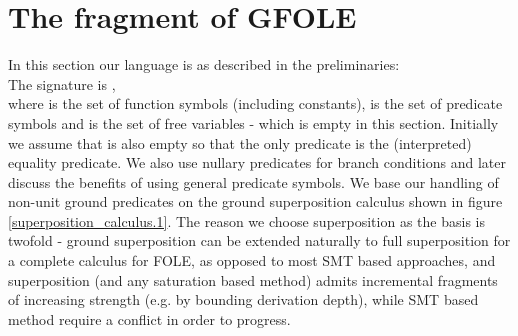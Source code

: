 \section{The fragment of GFOLE}\label{section:gfole_basic}
In this section our language is as described in the preliminaries:\\
The signature is \m{\Sigma=\Fs{\Sigma} \cup \Ps{\Sigma} \cup \Vs{\Sigma}},\\
where \m{\Fs{\Sigma}} is the set of function symbols (including constants), \Ps{\Sigma} is the set of predicate symbols and \Vs{\Sigma} is the set of free variables - which is empty in this section.
Initially we assume that \Ps{\Sigma} is also empty so that the only predicate is the (interpreted) equality predicate.
We also use nullary predicates for branch conditions and later discuss the benefits of using general predicate symbols.
We base our handling of non-unit ground predicates on the ground superposition calculus shown in figure \ref{superposition_calculus.1}.
The reason we choose superposition as the basis is twofold - ground superposition can be extended naturally to full superposition for a complete calculus for FOLE, as opposed to most SMT based approaches, and superposition (and any saturation based method) admits incremental fragments of increasing strength (e.g. by bounding derivation depth), while SMT based method require a conflict in order to progress.

